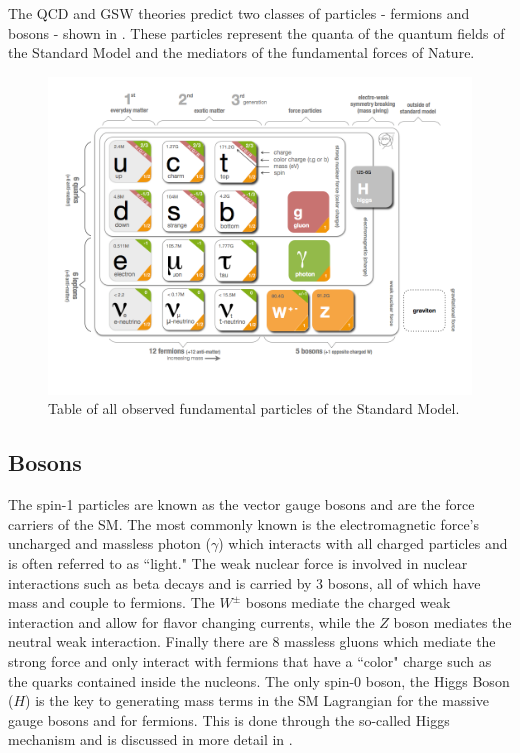 The QCD and GSW theories predict two classes of particles - fermions and bosons -
shown in . These particles represent the quanta
of the quantum fields of the Standard Model and the mediators of the fundamental
forces of Nature.

\begin{figure}[!htbp]
  \begin{center}
    \includegraphics[width=\linewidth]{figures/theory/standard_model.png}
    \caption{ Table of all observed fundamental particles of the Standard
Model. \cite{Purcell:1473657}}
    \label{fig:standard_model}
  \end{center}
\end{figure}

\subsection{Bosons} \label{sec:theory:bosons}

The spin-1 particles are known as the vector gauge bosons and are the force
carriers of the SM.  The most commonly known is the electromagnetic force's
uncharged and massless photon ($\gamma$) which interacts with all charged
particles and is often referred to as ``light."  The weak nuclear force is
involved in nuclear interactions such as beta decays and is carried by 3
bosons, all of which have mass and couple to fermions.  The $W^{\pm}$ bosons
mediate the charged weak interaction and allow for flavor changing currents,
while the $Z$ boson mediates the neutral weak interaction.  Finally there are 8
massless gluons which mediate the strong force and only interact with fermions
that have a ``color" charge such as the quarks contained inside the nucleons. The
only spin-0 boson, the Higgs Boson ($H$) is the key to generating mass terms in
the SM Lagrangian for the massive gauge bosons and for fermions.  This is done
through the so-called Higgs mechanism \cite{Thomson:2013zua} and is discussed
in more detail in .

